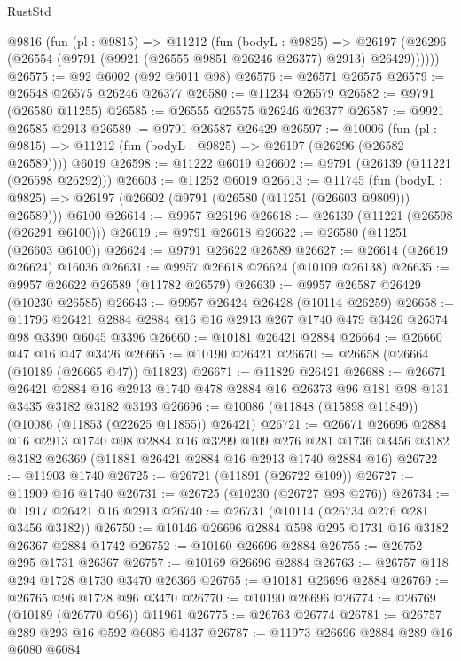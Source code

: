 \begin{lexlean}{RustStd}
\begin{coremodule}
    @9816
      (fun (pl : @9815) =>
      @11212
        (fun (bodyL : @9825) =>
        @26197 (@26296 (@26554 (@9791 (@9921 (@26555 @9851 @26246 @26377) @2913) @26429))))))
@26575 := @92 @6002 (@92 @6011 @98)
@26576 := @26571 @26575
@26579 := @26548 @26575 @26246 @26377
@26580 := @11234 @26579
@26582 := @9791 (@26580 @11255)
@26585 := @26555 @26575 @26246 @26377
@26587 := @9921 @26585 @2913
@26589 := @9791 @26587 @26429
@26597 := @10006
    (fun (pl : @9815) => @11212 (fun (bodyL : @9825) => @26197 (@26296 (@26582 @26589))))
    @6019
@26598 := @11222 @6019
@26602 := @9791 (@26139 (@11221 (@26598 @26292)))
@26603 := @11252 @6019
@26613 := @11745
    (fun (bodyL : @9825) => @26197 (@26602 (@9791 (@26580 (@11251 (@26603 @9809))) @26589)))
    @6100
@26614 := @9957 @26196
@26618 := @26139 (@11221 (@26598 (@26291 @6100)))
@26619 := @9791 @26618
@26622 := @26580 (@11251 (@26603 @6100))
@26624 := @9791 @26622 @26589
@26627 := @26614 (@26619 @26624) @16036
@26631 := @9957 @26618 @26624 (@10109 @26138)
@26635 := @9957 @26622 @26589 (@11782 @26579)
@26639 := @9957 @26587 @26429 (@10230 @26585)
@26643 := @9957 @26424 @26428 (@10114 @26259)
@26658 := @11796 @26421 @2884 @2884 @16 @16 @2913 @267 @1740 @479 @3426 @26374 @98 @3390 @6045 @3396
@26660 := @10181 @26421 @2884
@26664 := @26660 @47 @16 @47 @3426
@26665 := @10190 @26421
@26670 := @26658 (@26664 (@10189 (@26665 @47)) @11823)
@26671 := @11829 @26421
@26688 := @26671
    @26421
    @2884
    @16
    @2913
    @1740
    @478
    @2884
    @16
    @26373
    @96
    @181
    @98
    @131
    @3435
    @3182
    @3182
    @3193
@26696 := @10086 (@11848 (@15898 @11849)) (@10086 (@11853 (@22625 @11855)) @26421)
@26721 := @26671
    @26696
    @2884
    @16
    @2913
    @1740
    @98
    @2884
    @16
    @3299
    @109
    @276
    @281
    @1736
    @3456
    @3182
    @3182
    @26369
    (@11881 @26421 @2884 @16 @2913 @1740 @2884 @16)
@26722 := @11903 @1740
@26725 := @26721 (@11891 (@26722 @109))
@26727 := @11909 @16 @1740
@26731 := @26725 (@10230 (@26727 @98 @276))
@26734 := @11917 @26421 @16 @2913
@26740 := @26731 (@10114 (@26734 @276 @281 @3456 @3182))
@26750 := @10146 @26696 @2884 @598 @295 @1731 @16 @3182 @26367 @2884 @1742
@26752 := @10160 @26696 @2884
@26755 := @26752 @295 @1731 @26367
@26757 := @10169 @26696 @2884
@26763 := @26757 @118 @294 @1728 @1730 @3470 @26366
@26765 := @10181 @26696 @2884
@26769 := @26765 @96 @1728 @96 @3470
@26770 := @10190 @26696
@26774 := @26769 (@10189 (@26770 @96)) @11961
@26775 := @26763 @26774
@26781 := @26757 @289 @293 @16 @592 @6086 @4137
@26787 := @11973 @26696 @2884 @289 @16 @6080 @6084

\end{coremodule}
\end{lexlean}
